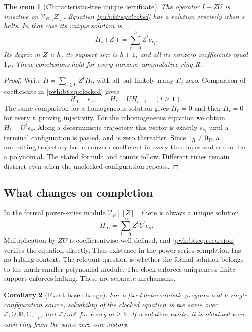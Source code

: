 \documentclass[11pt,letterpaper]{article}
\numberwithin{equation}{section}
\newtheorem{theorem}{Theorem}[section]
\newtheorem{corollary}[theorem]{Corollary}
\theoremstyle{definition}
\newcommand{\Z}{\mathbb Z}
\newcommand{\Q}{\mathbb Q}
\newcommand{\R}{\mathbb R}
\newcommand{\C}{\mathbb C}
\newcommand{\Fbb}{\mathbb F}
\newcommand{\V}{\mathcal V}
\begin{document}
\begin{theorem}[Characteristic-free unique certificate]\label{pwh:bt:thm:clocked}
The operator $I-ZU$ is injective on $\V_R[Z]$. Equation
\eqref{pwh:bt:eq:clocked} has a solution precisely when $s$ halts. In that case
its unique solution is
\begin{equation}\label{pwh:bt:eq:unique-history}
 H_s(Z)=\sum_{t=0}^{h}Z^t e_{c_t}.
\end{equation}
Its degree in $Z$ is $h$, its support size is $h+1$, and all its nonzero
coefficients equal $1_R$. These conclusions hold for every nonzero
commutative ring $R$.
\end{theorem}

\begin{proof}
Write $H=\sum_{t\ge0}Z^tH_t$, with all but finitely many $H_t$ zero.
Comparison of coefficients in \eqref{pwh:bt:eq:clocked} gives
\begin{equation}\label{pwh:bt:eq:recursion}
 H_0=e_s,\qquad H_t=UH_{t-1}\quad(t\ge1).
\end{equation}
The same comparison for a homogeneous solution gives $H_0=0$ and then
$H_t=0$ for every $t$, proving injectivity. For the inhomogeneous equation
we obtain $H_t=U^te_s$. Along a deterministic trajectory this vector is
exactly $e_{c_t}$ until a terminal configuration is passed, and is zero
thereafter. Since $1_R\ne0_R$, a nonhalting trajectory has a nonzero
coefficient in every time layer and cannot be a polynomial. The stated
formula and counts follow. Different times remain distinct even when
the unclocked configuration repeats.
\end{proof}

\subsection{What changes on completion}
In the formal power-series module $\V_R[[Z]]$ there is always a unique
solution,
\begin{equation}\label{pwh:bt:eq:formal}
 H_\infty=\sum_{t=0}^{\infty}Z^tU^te_s.
\end{equation}
Multiplication by $ZU$ is coefficientwise well-defined, and
\eqref{pwh:bt:eq:recursion} verifies the equation directly. Thus existence in
the power-series completion has no halting content. The relevant
question is whether the formal solution belongs to the much smaller
polynomial module. The clock enforces uniqueness; finite support
enforces halting. These are separate mechanisms.

\begin{corollary}[Exact base change]\label{pwh:bt:cor:basechange}
For a fixed deterministic program and a single configuration source,
solvability of the clocked equation is the same over
$\Z,\Q,\R,\C,\Fbb_p$, and $\Z/m\Z$ for every $m\ge2$.
If a solution exists, it is obtained over each ring from the same
zero--one history.
\end{corollary}
\end{document}
